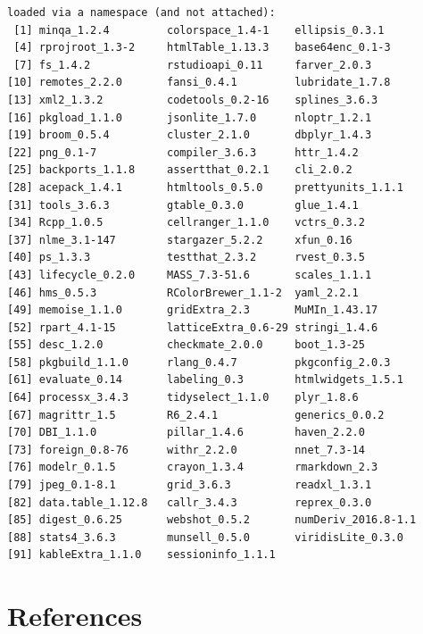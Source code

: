 \documentclass[12pt,oneside]{dukestatscithesis} %
\begin{document}
\begin{verbatim}
loaded via a namespace (and not attached):
 [1] minqa_1.2.4         colorspace_1.4-1    ellipsis_0.3.1     
 [4] rprojroot_1.3-2     htmlTable_1.13.3    base64enc_0.1-3    
 [7] fs_1.4.2            rstudioapi_0.11     farver_2.0.3       
[10] remotes_2.2.0       fansi_0.4.1         lubridate_1.7.8    
[13] xml2_1.3.2          codetools_0.2-16    splines_3.6.3      
[16] pkgload_1.1.0       jsonlite_1.7.0      nloptr_1.2.1       
[19] broom_0.5.4         cluster_2.1.0       dbplyr_1.4.3       
[22] png_0.1-7           compiler_3.6.3      httr_1.4.2         
[25] backports_1.1.8     assertthat_0.2.1    cli_2.0.2          
[28] acepack_1.4.1       htmltools_0.5.0     prettyunits_1.1.1  
[31] tools_3.6.3         gtable_0.3.0        glue_1.4.1         
[34] Rcpp_1.0.5          cellranger_1.1.0    vctrs_0.3.2        
[37] nlme_3.1-147        stargazer_5.2.2     xfun_0.16          
[40] ps_1.3.3            testthat_2.3.2      rvest_0.3.5        
[43] lifecycle_0.2.0     MASS_7.3-51.6       scales_1.1.1       
[46] hms_0.5.3           RColorBrewer_1.1-2  yaml_2.2.1         
[49] memoise_1.1.0       gridExtra_2.3       MuMIn_1.43.17      
[52] rpart_4.1-15        latticeExtra_0.6-29 stringi_1.4.6      
[55] desc_1.2.0          checkmate_2.0.0     boot_1.3-25        
[58] pkgbuild_1.1.0      rlang_0.4.7         pkgconfig_2.0.3    
[61] evaluate_0.14       labeling_0.3        htmlwidgets_1.5.1  
[64] processx_3.4.3      tidyselect_1.1.0    plyr_1.8.6         
[67] magrittr_1.5        R6_2.4.1            generics_0.0.2     
[70] DBI_1.1.0           pillar_1.4.6        haven_2.2.0        
[73] foreign_0.8-76      withr_2.2.0         nnet_7.3-14        
[76] modelr_0.1.5        crayon_1.3.4        rmarkdown_2.3      
[79] jpeg_0.1-8.1        grid_3.6.3          readxl_1.3.1       
[82] data.table_1.12.8   callr_3.4.3         reprex_0.3.0       
[85] digest_0.6.25       webshot_0.5.2       numDeriv_2016.8-1.1
[88] stats4_3.6.3        munsell_0.5.0       viridisLite_0.3.0  
[91] kableExtra_1.1.0    sessioninfo_1.1.1  
\end{verbatim}
\backmatter

\hypertarget{references}{%
\chapter*{References}\label{references}}


\noindent

\setlength{\parindent}{-0.20in}
\setlength{\leftskip}{0.20in}
\setlength{\parskip}{8pt}
\end{document}
